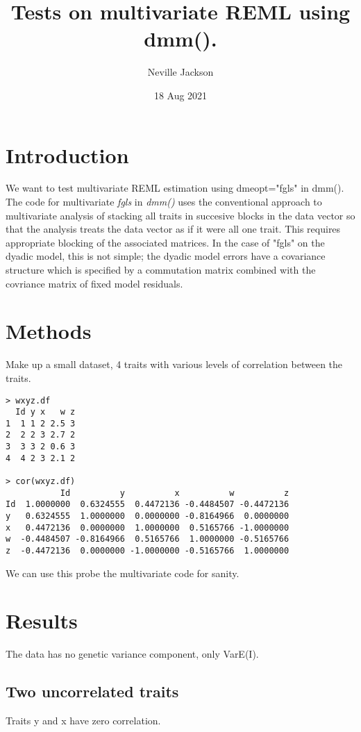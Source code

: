 \documentclass{report}  %
\title{ Tests on multivariate REML using dmm().}
\author{Neville Jackson }
\date{18 Aug 2021 }
\begin{document}
 
 
\maketitle      

\section{Introduction} 
 We want to test multivariate REML estimation using dmeopt="fgls" in dmm(). The code for multivariate {\em fgls} in {\em dmm()} uses the conventional approach to multivariate analysis of stacking all traits in succesive blocks in the data vector so that the analysis treats the data vector as if it were all one trait. This requires appropriate blocking of the associated matrices. In the case of "fgls" on the dyadic model, this is not simple; the dyadic model errors have a covariance structure which is specified by a commutation matrix combined with the  covriance matrix of fixed model residuals.

\section{Methods}
Make up a small dataset, 4 traits with various levels of correlation between the traits. 
\begin{verbatim}
> wxyz.df
  Id y x   w z
1  1 1 2 2.5 3
2  2 2 3 2.7 2
3  3 3 2 0.6 3
4  4 2 3 2.1 2

> cor(wxyz.df)
           Id          y          x          w          z
Id  1.0000000  0.6324555  0.4472136 -0.4484507 -0.4472136
y   0.6324555  1.0000000  0.0000000 -0.8164966  0.0000000
x   0.4472136  0.0000000  1.0000000  0.5165766 -1.0000000
w  -0.4484507 -0.8164966  0.5165766  1.0000000 -0.5165766
z  -0.4472136  0.0000000 -1.0000000 -0.5165766  1.0000000

\end{verbatim}
We can use this probe the multivariate code for sanity.

\section{Results}
The data has no genetic variance component, only VarE(I). 

\subsection{Two uncorrelated traits}
Traits y and x have zero correlation. 
\end{document}
